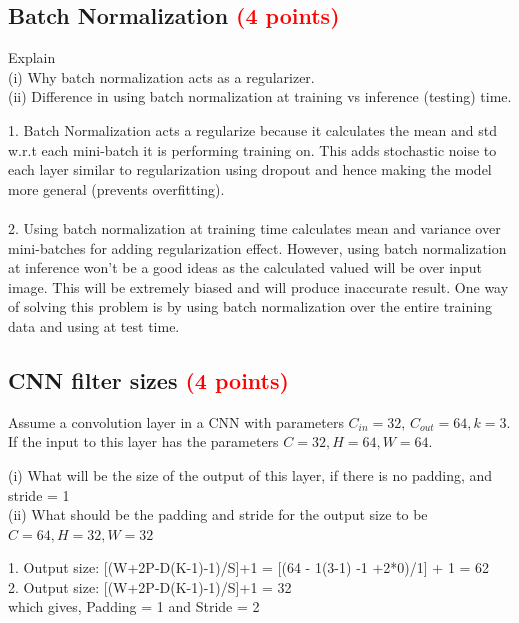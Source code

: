 \documentclass[answers]{exam}
\newcommand{\mypoints}[1]{\textcolor{red}{(#1 points)}}
\begin{document}
\subsection{Batch Normalization \mypoints{4}}
Explain \\ 
(i) Why batch normalization acts as a regularizer. \\ 
(ii) Difference in using batch normalization at training vs inference (testing) time. 
\begin{solution}
1. Batch Normalization acts a regularize because it calculates the mean and std w.r.t each mini-batch it is performing training on. This adds stochastic noise to each layer similar to regularization using dropout and hence making the model more general (prevents overfitting).\\
\\
2. Using batch normalization at training time calculates mean and variance over mini-batches for adding regularization effect. However, using batch normalization at inference won't be a good ideas as the calculated valued will be over input image. This will be extremely biased and will produce inaccurate result. One way of solving this problem is by using batch normalization over the entire training data and using at test time.
\end{solution}

\subsection{CNN filter sizes \mypoints{4}}
Assume a convolution layer in a CNN with parameters $C_{in} = 32$, $C_{out} = 64, k = 3$. If the input to this layer has the parameters $C = 32, H = 64, W = 64$. 

(i) What will be the size of the output of this layer, if there is no padding, and stride = 1  \\
(ii) What should be the padding and stride for the output size to be $C = 64, H = 32, W = 32$ 
\begin{solution}
1. Output size: [(W+2P-D(K-1)-1)/S]+1 = [(64 - 1(3-1) -1 +2*0)/1] + 1 = 62\\
2. Output size: [(W+2P-D(K-1)-1)/S]+1 = 32\\
which gives, Padding = 1 and Stride = 2
\end{solution}
\end{document}
